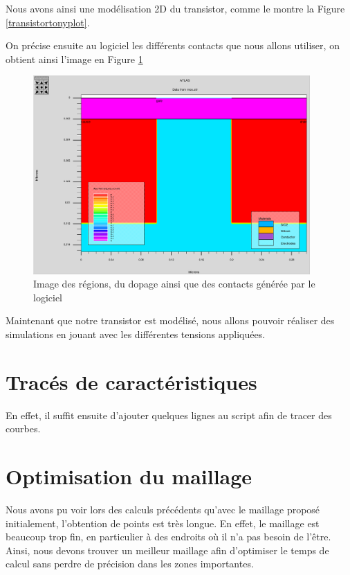 \documentclass[a4paper,11pt]{report}
\begin{document}
Nous avons ainsi une modélisation 2D du transistor, comme le montre la Figure \ref{transistortonyplot}.

On précise ensuite au logiciel les différents contacts que nous allons utiliser, on obtient ainsi l'image en Figure \ref{TransistorFull}

\begin{figure}
    \centering
    \includegraphics[width=300pt]{TransistorFull.png}
    \caption{Image des régions, du dopage ainsi que des contacts générée par le logiciel}
    \label{TransistorFull}
\end{figure}

Maintenant que notre transistor est modélisé, nous allons pouvoir réaliser des simulations en jouant avec les différentes tensions appliquées.

\section{Tracés de caractéristiques}

En effet, il suffit ensuite d'ajouter quelques lignes au script afin de tracer des courbes.



\section{Optimisation du maillage}

Nous avons pu voir lors des calculs précédents qu'avec le maillage proposé initialement, l'obtention de points est très longue. En effet, le maillage est beaucoup trop fin, en particulier à des endroits où il n'a pas besoin de l'être. Ainsi, nous devons trouver un meilleur maillage afin d'optimiser le temps de calcul sans perdre de précision dans les zones importantes. 
\end{document}
